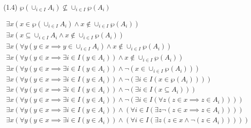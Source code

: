 \documentclass{article}
\begin{document}
\begin{center}
(1.4) $\wp(\cup_{i \in I} A_i) \nsubseteq \cup_{i \in I} \wp(A_i)$
\end{center}
\begin{align*}
\exists x(x \in \wp(\cup_{i \in I} A_i) \land x \notin \cup_{i \in I} \wp(A_i)) \\
\exists x(x \subseteq \cup_{i \in I} A_i \land x \notin \cup_{i \in I} \wp(A_i)) \\
\exists x( \forall y (y \in x \implies y \in \cup_{i \in I} A_i) \land
x \notin \cup_{i \in I} \wp(A_i)) \\
\exists x( \forall y (y \in x \implies \exists i \in I(y \in A_i))
\land x \notin \cup_{i \in I} \wp(A_i)) \\
\exists x( \forall y (y \in x \implies \exists i \in I(y \in A_i))
\land \neg (x \in \cup_{i \in I} \wp(A_i))) \\
\exists x( \forall y (y \in x \implies \exists i \in I(y \in A_i))
\land \neg (\exists i \in I(x \in \wp(A_i)))) \\
\exists x( \forall y (y \in x \implies \exists i \in I(y \in A_i))
\land \neg (\exists i \in I(x \subseteq A_i))) \\
\exists x( \forall y (y \in x \implies \exists i \in I(y \in A_i))
\land \neg (\exists i \in I(\forall z (z \in x \implies z \in A_i)))) \\
\exists x( \forall y (y \in x \implies \exists i \in I(y \in A_i))
\land (\forall i \in I(\exists z \neg(z \in x \implies z \in A_i)))) \\
\exists x( \forall y (y \in x \implies \exists i \in I(y \in A_i))
\land (\forall i \in I(\exists z (z \in x \land \neg(z \in A_i))))) \\
\end{align*}
\end{document}
